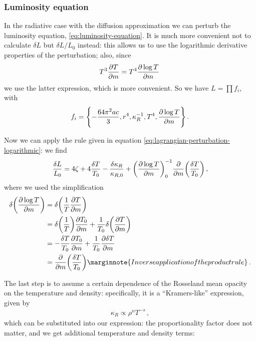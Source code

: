 \documentclass[main.tex]{subfiles}
\begin{document}

\subsubsection{Luminosity equation}

In the radiative case with the diffusion approximation we can perturb the luminosity equation, \eqref{eq:luminosity-equation}. It is much more convenient not to calculate \(\delta L\) but \(\delta L  / L_0 \) instead: this allows us to use the logarithmic derivative properties of the perturbation; also, since 
%
\begin{align}
T^{3} \pdv{T}{m} = T^{4} \pdv{\log T}{m}
\,
\end{align}
%
we use the latter expression, which is more convenient. 
So we have \(L = \prod f_i\), with 
%
\begin{align}
f_{i} = \qty{- \frac{64 \pi^2 ac}{3}, r^{4}, \kappa_{R}^{-1}, T^{4}, \pdv{\log T}{m}}
\,.
\end{align}

Now we can apply the rule given in equation \eqref{eq:lagrangian-perturbation-logarithmic}: we find
%
\begin{equation}
  \frac{\delta L}{L_0} = 4 \zeta + 4 \frac{\delta T}{T_0} - \frac{\delta \kappa_R}{\kappa_{R,0}} + \qty(\pdv{\log T}{m})^{-1}_{0} \pdv{}{m} \qty( \frac{\delta T}{T_0 })
  \,,
\end{equation}
%
where we used the simplification 
%
\begin{align}
\delta \qty(\pdv{\log T}{m}) &= \delta \qty(\frac{1}{T} \pdv{T}{m})  \\
&= \delta \qty(\frac{1}{T}) \pdv{T_0 }{m} + \frac{1}{T_0 }  \delta \qty(\pdv{T}{m})  \\
&= - \frac{ \delta T}{ T_{0}} \pdv{T_0 }{m} + \frac{1}{T_0 } \pdv{ \delta T }{m }  \\
&= \pdv{}{m} \qty(\frac{ \delta T}{T_0 }) \marginnote{Inverse application of the product rule}
\,.
\end{align}

The last step is to assume a certain dependence of the Rosseland mean opacity on the temperature and density: specifically, it is a ``Kramers-like'' expression, given by 
%
\begin{align}
\kappa_{R} \propto \rho^{n} T^{-s}
\,,
\end{align}
%
which can be substituted into our expression: the proportionality factor does not matter, and we get additional temperature and density terms: 
%
%
\end{document}
